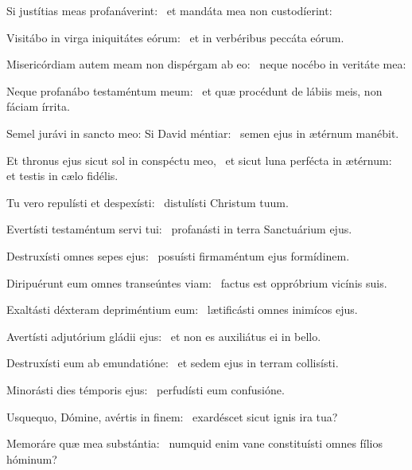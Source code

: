 \item Si justítias meas profanáverint:~\psstar{} et mandáta mea non custodíerint:

\item Visitábo in virga iniquitátes eórum:~\psstar{} et in verbéribus peccáta eórum.

\item Misericórdiam autem meam non dispérgam ab eo:~\psstar{} neque nocébo in veritáte mea:

\item Neque profanábo testaméntum meum:~\psstar{} et quæ procédunt de lábiis meis, non fáciam írrita.

\item Semel jurávi in sancto meo: Si David méntiar:~\psstar{} semen ejus in ætérnum manébit.

\item Et thronus ejus sicut sol in conspéctu meo,~\pscross{} et sicut luna perfécta in ætérnum:~\psstar{} et testis in cælo fidélis.

\item Tu vero repulísti et despexísti:~\psstar{} distulísti Christum tuum.

\item Evertísti testaméntum servi tui:~\psstar{} profanásti in terra Sanctuárium ejus.

\item Destruxísti omnes sepes ejus:~\psstar{} posuísti firmaméntum ejus formídinem.

\item Diripuérunt eum omnes transeúntes viam:~\psstar{} factus est oppróbrium vicínis suis.

\item Exaltásti déxteram depriméntium eum:~\psstar{} lætificásti omnes inimícos ejus.

\item Avertísti adjutórium gládii ejus:~\psstar{} et non es auxiliátus ei in bello.

\item Destruxísti eum ab emundatióne:~\psstar{} et sedem ejus in terram collisísti.

\item Minorásti dies témporis ejus:~\psstar{} perfudísti eum confusióne.

\item Usquequo, Dómine, avértis in finem:~\psstar{} exardéscet sicut ignis ira tua?

\item Memoráre quæ mea substántia:~\psstar{} numquid enim vane constituísti omnes fílios hóminum?

